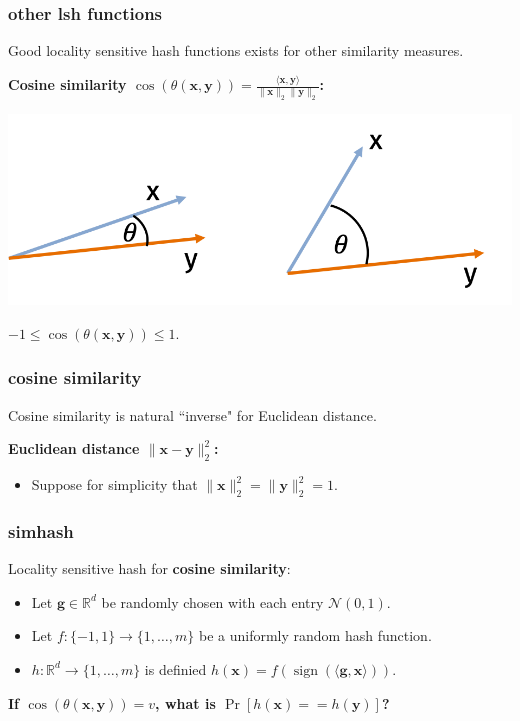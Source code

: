 \documentclass[compress]{beamer}
\newcommand{\bv}[1]{\mathbf{#1}}
\newcommand{\R}{\mathbb{R}}
\DeclareMathOperator{\sign}{sign}
\begin{document}
\begin{frame}
	\frametitle{other lsh functions}
	\begin{center}
	Good locality sensitive hash functions exists for other similarity measures.
	\end{center}
	\textbf{Cosine similarity $\cos\left(\theta(\bv{x},\bv{y})\right) = \frac{\langle \bv{x},\bv{y}\rangle}{\|\bv{x}\|_2\|\bv{y}\|_2}$:}
	\begin{center}
		\includegraphics[width=.7\textwidth]{cos_sim.png}
		
		$-1 \leq \cos\left(\theta(\bv{x},\bv{y})\right) \leq 1$.
	\end{center}
\end{frame}

\begin{frame}
	\frametitle{cosine similarity}
	\begin{center}
		Cosine similarity is natural ``inverse" for Euclidean distance.
	\end{center}
		\textbf{Euclidean distance $\|\bv{x} - \bv{y}\|_2^2$:}
		\begin{itemize}
			\item Suppose for simplicity that $\|\bv{x}\|_2^2 = \|\bv{y}\|_2^2 = 1$.
		\end{itemize}
\end{frame}

\begin{frame}
	\frametitle{simhash}
	Locality sensitive hash for \textbf{cosine similarity}:
	\begin{itemize}
		\item Let $\bv{g} \in \R^d$ be randomly chosen with each entry $\mathcal{N}(0,1)$. 
		\item Let $f: \{-1,1\} \rightarrow \{1,\ldots, m\}$ be a uniformly random hash function. 
		\item $h: \R^d \rightarrow \{1,\ldots, m\}$ is definied $h(\bv{x}) = f\left(\sign(\langle \bv{g}, \bv{x} \rangle)\right)$.
	\end{itemize}
	\begin{center}
		\alert{\textbf{
				\large
				If $\cos(\theta(\bv{x},\bv{y})) = v$, what is $\Pr[h(\bv{x}) == h(\bv{y})]$?
		}}
	\end{center}
\end{frame}
\end{document}
